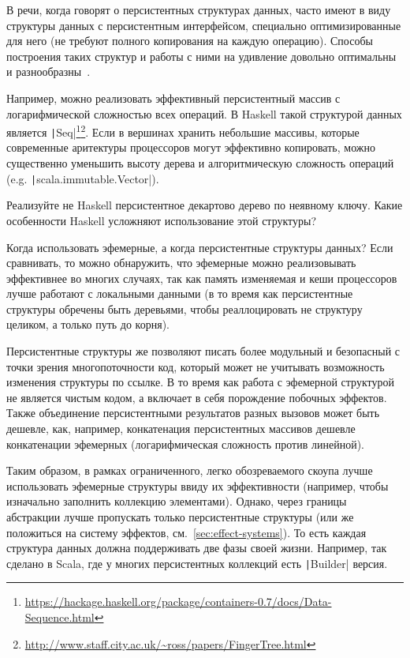 В речи, когда говорят о персистентных структурах данных, часто имеют в виду структуры данных с персистентным интерфейсом, специально оптимизированные для него (не требуют полного копирования на каждую операцию).
Способы построения таких структур и работы с ними на удивление довольно оптимальны и разнообразны~\cite{okasaki1999purely}.

Например, можно реализовать эффективный персистентный массив с логарифмической сложностью всех операций.
В Haskell такой структурой данных является \texttt|Seq|\footnote{\url{https://hackage.haskell.org/package/containers-0.7/docs/Data-Sequence.html}}\footnote{\url{http://www.staff.city.ac.uk/~ross/papers/FingerTree.html}}.
Если в вершинах хранить небольшие массивы, которые современные аритектуры процессоров могут эффективно копировать, можно существенно уменьшить высоту дерева и алгоритмическую сложность операций (e.g. \texttt|scala.immutable.Vector|).

\begin{task}
    Реализуйте не Haskell персистентное декартово дерево по неявному ключу.
    Какие особенности Haskell усложняют использование этой структуры?
\end{task}

Когда использовать эфемерные, а когда персистентные структуры данных?
Если сравнивать, то можно обнаружить, что эфемерные можно реализовывать эффективнее во многих случаях, так как память изменяемая и кеши процессоров лучше работают с локальными данными (в то время как персистентные структуры обречены быть деревьями, чтобы реаллоцировать не структуру целиком, а только путь до корня).

Персистентные структуры же позволяют писать более модульный и безопасный с точки зрения многопоточности код, который может не учитывать возможность изменения структуры по ссылке.
В то время как работа с эфемерной структурой не является чистым кодом, а включает в себя порождение побочных эффектов.
Также объединение персистентными результатов разных вызовов может быть дешевле, как, например, конкатенация персистентных массивов дешевле конкатенации эфемерных (логарифмическая сложность против линейной).

Таким образом, в рамках ограниченного, легко обозреваемого скоупа лучше использовать эфемерные структуры ввиду их эффективности (например, чтобы изначально заполнить коллекцию элементами).
Однако, через границы абстракции лучше пропускать только персистентные структуры (или же положиться на систему эффектов, см.~\ref{sec:effect-systems}).
То есть каждая структура данных должна поддерживать две фазы своей жизни.
Например, так сделано в Scala, где у многих персистентных коллекций есть \texttt|Builder| версия.

